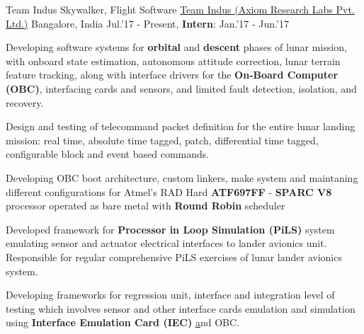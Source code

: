 \begin{cventries}
	\cventry
	{Team Indus Skywalker, Flight Software}
	{\href{http://www.teamindus.in/}{Team Indus (Axiom Research Labs Pvt. Ltd.)}}
	{Bangalore, India}
	{Jul.'17 - Present, \textbf{Intern}: Jan.'17 - Jun.'17}
	{
		\begin{cvitems}
			\item{Developing software systems for \textbf{orbital} and \textbf{descent} phases of lunar mission, with onboard state estimation, autonomous attitude correction, lunar terrain feature tracking, along with interface drivers for the \textbf{On-Board Computer (OBC)}\href{http://ww1.microchip.com/downloads/en/DeviceDoc/ATF697FF.pdf}, interfacing cards and sensors, and limited fault detection, isolation, and recovery.}
			\item{Design and testing of telecommand packet definition for the entire lunar landing mission: real time, absolute time tagged, patch, differential time tagged, configurable block and event based commands.}
			\item{Developing OBC boot architecture, custom linkers, make system and maintaning different configurations for Atmel's RAD Hard \textbf{ATF697FF} - \textbf{SPARC V8} processor operated as bare metal with \textbf{Round Robin} scheduler}
			\item{Developed framework for \textbf{Processor in Loop Simulation (PiLS)} system emulating sensor and actuator electrical interfaces to lander avionics unit. Responsible for regular comprehensive PiLS exercises of lunar lander avionics system.}
			\item{Developing frameworks for regression unit, interface and integration level of testing which involves sensor and other interface cards emulation and simulation using \textbf{Interface Emulation Card (IEC) }\href{http://zedboard.org/product/microzed/} and OBC.}
		\end{cvitems}
	}
\end{cventries}
